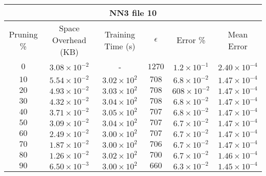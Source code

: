 \begin{adjustwidth}{0cm}{}
\begin{tabular}{cccccc}
\hline
\multicolumn{6}{c}{NN3 file 10} \\
\toprule
Pruning \% & Space Overhead (KB) & Training Time (s) & $\epsilon$ & Error \% & Mean Error\\
\midrule
$0$ & $3.08 \times 10^{-2}$ & - & $1270$ & $1.2 \times 10^{-1}$ & $2.40 \times 10^{-4}$\\
$10$ & $5.54 \times 10^{-2}$ & $3.02  \times 10^{2}$ & $708$ & $6.8 \times 10^{-2}$ & $1.47 \times 10^{-4}$\\
$20$ & $4.93 \times 10^{-2}$ & $3.03 \times 10^{2}$ & $708$ & $608 \times 10^{-2}$ & $1.47 \times 10^{-4}$\\
$30$ & $4.32 \times 10^{-2}$ & $3.04 \times 10^{2}$ & $708$ & $6.8 \times 10^{-2}$ & $1.47 \times 10^{-4}$\\
$40$ & $3.71 \times 10^{-2}$ & $3.05 \times 10^{2}$ & $707$ & $6.8 \times 10^{-2}$ & $1.47 \times 10^{-4}$\\
$50$ & $3.09 \times 10^{-2}$ & $3.04 \times 10^{2}$ & $707$ & $6.7 \times 10^{-2}$ & $1.47 \times 10^{-4}$\\
$60$ & $2.49 \times 10^{-2}$ & $3.00 \times 10^{2}$ & $707$ & $6.7 \times 10^{-2}$ & $1.47 \times 10^{-4}$\\
$70$ & $1.87 \times 10^{-2}$ & $3.00 \times 10^{2}$ & $706$ & $6.7 \times 10^{-2}$ & $1.47 \times 10^{-4}$\\
$80$ & $1.26 \times 10^{-2}$ & $3.02 \times 10^{2}$ & $700$ & $6.7 \times 10^{-2}$ & $1.46 \times 10^{-4}$\\
$90$ & $6.50 \times 10^{-3}$ & $3.00 \times 10^{2}$ & $660$ & $6.3 \times 10^{-2}$ & $1.45 \times 10^{-4}$\\
\bottomrule
\end{tabular}
\end{adjustwidth}
